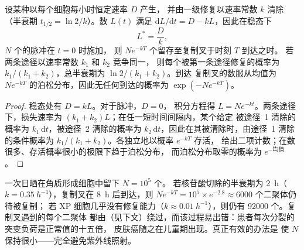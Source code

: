 \begin{theorem}\label{thm:b3:dna-repair:load}
设某种以每个细胞每小时恒定速率 $D$ 产生，
并由一级修复以速率常数 $k$ 清除
（半衰期 $t_{1/2} = \ln 2/k$）。数 $L(t)$ 满足
$\mathrm{d}L/\mathrm{d}t = D - kL$，因此在稳态下
\[
L^{*} = \frac{D}{k},
\]
$N$ 个的脉冲在 $t = 0$ 时施加，
则 $N e^{-kT}$ 个留存至复制叉于时刻 $T$ 到达之时。
若两条途径以速率常数 $k_{1}$ 和 $k_{2}$ 竞争同一，
则每个被第一条途径修复的概率为 $k_{1}/(k_{1} +
k_{2})$，总半衰期为 $\ln 2/(k_{1} + k_{2})$。到达
复制叉的数服从均值为
$N e^{-kT}$ 的泊松分布，因此无任何到达的概率为 $\exp(-N e^{-kT})$。
\end{theorem}
\begin{proof}
稳态处有 $D = kL$。对于脉冲，$D = 0$，
积分方程得 $L = N e^{-kt}$。两条途径下，损失速率为
$(k_{1} + k_{2})L$；在任一短时间间隔内，某个给定
被途径~1 清除的概率为 $k_{1}\,\mathrm{d}t$，被途径~2 清除的概率为
$k_{2}\,\mathrm{d}t$，因此在其被清除时，由途径~1 清除的条件概率为
$k_{1}/(k_{1} +
k_{2})$。各独立地以概率 $e^{-kT}$ 存活，
给出二项计数；在数很多、存活概率很小的极限下趋于泊松分布，
而泊松分布取零的概率为 $e^{-\text{均值}}$。
\end{proof}

\begin{example}[为何着色性干皮病是复制叉的疾病]\label{ex:b3:dna-repair:xp}
一次日晒在角质形成细胞中留下 $N = 10^{5}$ 个。
若核苷酸切除的半衰期为 \qty{2}{h}（$k =
\qty{0.35}{h^{-1}}$），复制叉在 \qty{8}{h} 后到达，则 $N e^{-kT} =
10^{5}\times e^{-2.8} \approx 6000$ 个二聚体仍待被复制；
若 XP 细胞几乎没有修复能力（$k \approx
\qty{0.01}{h^{-1}}$），则仍有 \num{92000} 个。复制叉遇到的每个二聚体
都由（见下文）绕过，而该过程易出错：患者每次分裂的
突变负荷是正常值的十五倍，
皮肤癌随之在儿童期出现。真正有效的办法是
使 $N$ 保持很小——完全避免紫外线照射。
\end{example}

